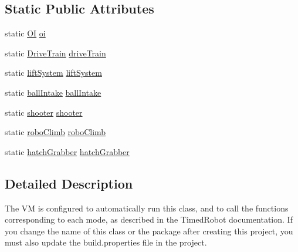 \subsection*{Static Public Attributes}
\begin{DoxyCompactItemize}
\item 
static \mbox{\hyperlink{classorg_1_1usfirst_1_1frc3707_1_1_creedence_1_1_o_i}{OI}} \mbox{\hyperlink{classorg_1_1usfirst_1_1frc3707_1_1_creedence_1_1_robot_a96f7c8fc21b7333a03f7cab88957d9bf}{oi}}
\item 
static \mbox{\hyperlink{classorg_1_1usfirst_1_1frc3707_1_1_creedence_1_1subsystems_1_1_drive_train}{Drive\+Train}} \mbox{\hyperlink{classorg_1_1usfirst_1_1frc3707_1_1_creedence_1_1_robot_a1db673612e778c05b029a92428f1702b}{drive\+Train}}
\item 
static \mbox{\hyperlink{classorg_1_1usfirst_1_1frc3707_1_1_creedence_1_1subsystems_1_1lift_system}{lift\+System}} \mbox{\hyperlink{classorg_1_1usfirst_1_1frc3707_1_1_creedence_1_1_robot_a459a2a39c6ae9af4e6aa11a64dd7e524}{lift\+System}}
\item 
static \mbox{\hyperlink{classorg_1_1usfirst_1_1frc3707_1_1_creedence_1_1subsystems_1_1ball_intake}{ball\+Intake}} \mbox{\hyperlink{classorg_1_1usfirst_1_1frc3707_1_1_creedence_1_1_robot_ad208da036c69bf3511a88635cce38581}{ball\+Intake}}
\item 
static \mbox{\hyperlink{classorg_1_1usfirst_1_1frc3707_1_1_creedence_1_1subsystems_1_1shooter}{shooter}} \mbox{\hyperlink{classorg_1_1usfirst_1_1frc3707_1_1_creedence_1_1_robot_a7f1d0cb6e12db3b5317d374c63a6249a}{shooter}}
\item 
static \mbox{\hyperlink{classorg_1_1usfirst_1_1frc3707_1_1_creedence_1_1subsystems_1_1robo_climb}{robo\+Climb}} \mbox{\hyperlink{classorg_1_1usfirst_1_1frc3707_1_1_creedence_1_1_robot_a8f86b89da7df1475d726eb3f9ae2b1f9}{robo\+Climb}}
\item 
static \mbox{\hyperlink{classorg_1_1usfirst_1_1frc3707_1_1_creedence_1_1subsystems_1_1hatch_grabber}{hatch\+Grabber}} \mbox{\hyperlink{classorg_1_1usfirst_1_1frc3707_1_1_creedence_1_1_robot_a7b71db96427945234f7528864227d98b}{hatch\+Grabber}}
\end{DoxyCompactItemize}


\subsection{Detailed Description}
The VM is configured to automatically run this class, and to call the functions corresponding to each mode, as described in the Timed\+Robot documentation. If you change the name of this class or the package after creating this project, you must also update the build.\+properties file in the project. 

